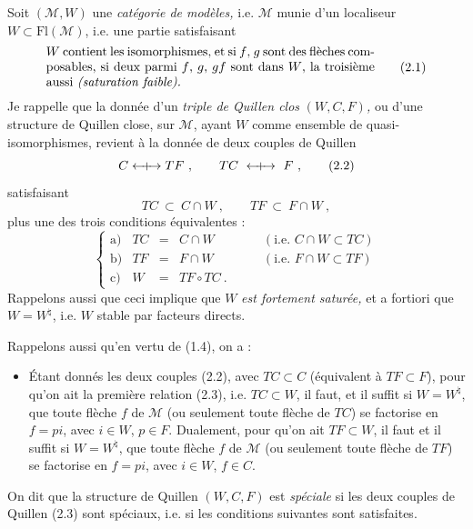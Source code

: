 \documentclass[11pt]{article}
\newcommand{\printedpage}[1]{\marginpar{\footnotesize p.~#1}}
\newcommand{\msp}[1]{\marginpar{\footnotesize [#1]}}
\newcommand{\Qcouple}{\mathrel{\leftarrow\mkern-9mu{+}\mkern-9mu\rightarrow}}
\newcommand{\M}{\mathcal{M}}
\begin{document}
Soit $(\mathcal{M}, W)$ une \textit{catégorie de modèles,} i.e. $\mathcal{M}$ munie d'un localiseur $W \subset \mathrm{Fl}(\mathcal{M})$, i.e. une partie satisfaisant
\[
\parbox{0.75\textwidth}{$W$ contient les isomorphismes, et si $f$, $g$ sont des flèches composables, si deux parmi $f$, $g$, $gf$ sont dans $W$, la troisième aussi \textit{(saturation faible).}}
\tag*{(2.1)}
\]
Je rappelle que la donnée d'un \textit{triple de Quillen clos} $(W, C, F)$\textit{,} ou d'une structure de Quillen close, sur $\mathcal{M}$, ayant $W$ comme ensemble de quasi-isomorphismes, revient à la donnée de deux couples de Quillen
\[
C \Qcouple TF\ , \qquad TC \ \Qcouple\ F\ , \tag*{(2.2)}
\]
satisfaisant
\[
TC \ \subset\ C \cap W\ , \qquad TF \ \subset\ F \cap W\ , \tag*{(2.3)}
\]
plus une des trois conditions équivalentes :
\[
\left\{
\begin{array}{lrcll}
\text{a)} & TC & = & C \cap W & \qquad (\text{i.e. } C \cap W \subset TC) \\[1ex]
\text{b)} & TF & = & F \cap W & \qquad (\text{i.e. } F \cap W \subset TF) \\[1ex]
\text{c)} & W & = & TF \circ TC\ . &
\end{array}
\right.
\tag*{(2.4)}
\]
Rappelons aussi que ceci implique que $W$ \textit{est fortement saturée,} et a fortiori que $W = W^{\natural}$, i.e. $W$ stable par facteurs directs.

Rappelons aussi qu'en vertu de (1.4), on a :

\printedpage{9}

\msp{page 14}

\begin{itemize}[leftmargin=4em]
\item[(2.5)] Étant donnés les deux couples (2.2), avec $TC \subset C$ (équivalent à $TF \subset F$), pour qu'on ait la première relation (2.3), i.e. $TC \subset W$, il faut, et il suffit si $W = W^{\natural}$, que toute flèche $f$ de $\M$ (ou seulement toute flèche de $TC$) se factorise en $f = pi$, avec $i \in W$, $p \in F$. Dualement, pour qu'on ait $TF \subset W$, il faut et il suffit si $W = W^{\natural}$, que toute flèche $f$ de $\M$ (ou seulement toute flèche de $TF$) se factorise en $f = pi$, avec $i \in W$, $f \in C$. %
\end{itemize}

On dit que la structure de Quillen $(W,C,F)$ est \textit{spéciale} si les deux couples de Quillen (2.3) sont spéciaux, i.e. si les conditions suivantes sont satisfaites.
\end{document}
